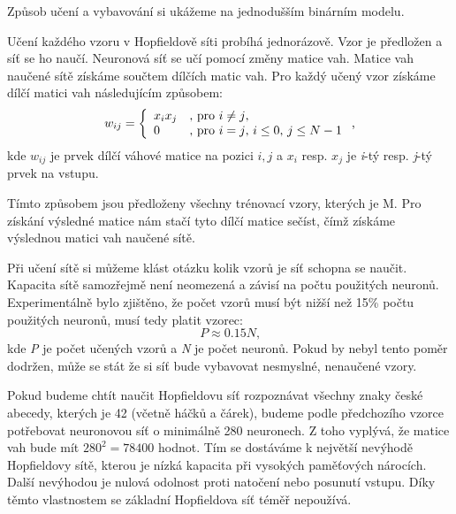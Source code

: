 \documentclass[11pt,twoside,a4paper]{book}
\begin{document}
Způsob učení a vybavování si ukážeme na jednodušším binárním modelu.

Učení každého vzoru v Hopfieldově síti probíhá jednorázově. Vzor je předložen a síť se ho naučí. Neuronová síť se učí pomocí změny matice vah. Matice vah naučené sítě získáme součtem dílčích matic vah. Pro každý učený vzor získáme dílčí matici vah následujícím způsobem:
\begin{equation}
w_{ij} = \left\{ 
\begin{array}{l l}
  x_{i}x_{j} &  \mbox{, pro $i\neq j$, }\\
  0 & \mbox{,  pro $i=j$, $i\leq0$, $j\leq N-1$}\\ \end{array} \right. \mbox{,}
\end{equation}
kde $w_{ij}$ je prvek dílčí váhové matice na pozici $i,j$ a $x_{i}$ resp. $x_{j}$ je \textit{i}-tý resp. \textit{j}-tý prvek na vstupu.

Tímto způsobem jsou předloženy všechny trénovací vzory, kterých je M. Pro získání výsledné matice nám stačí tyto dílčí matice sečíst, čímž získáme výslednou matici vah naučené sítě.

Při učení sítě si můžeme klást otázku kolik vzorů je síť schopna se naučit. Kapacita sítě samozřejmě není neomezená a závisí na počtu použitých neuronů. Experimentálně bylo zjištěno, že počet vzorů musí být nižší než 15\% počtu použitých neuronů\cite{skripta}, musí tedy platit vzorec:
\begin{equation}
P\approx 0.15N \mbox{,}
\end{equation}
kde \textit{P} je počet učených vzorů a \textit{N} je počet neuronů. Pokud by nebyl tento poměr dodržen, může se stát že si síť bude vybavovat nesmyslné, nenaučené vzory.

Pokud budeme chtít naučit Hopfieldovu síť rozpoznávat všechny znaky české abecedy, kterých je 42 (včetně háčků a čárek), budeme podle předchozího vzorce potřebovat neuronovou síť o minimálně 280 neuronech. Z toho vyplývá, že matice vah bude mít \begin{math}280^{2}=78400\end{math} hodnot. Tím se dostáváme k největší nevýhodě Hopfieldovy sítě, kterou je nízká kapacita při vysokých paměťových nárocích. Další nevýhodou je nulová odolnost proti natočení nebo posunutí vstupu. Díky těmto vlastnostem se základní Hopfieldova síť téměř nepoužívá.
\end{document}
